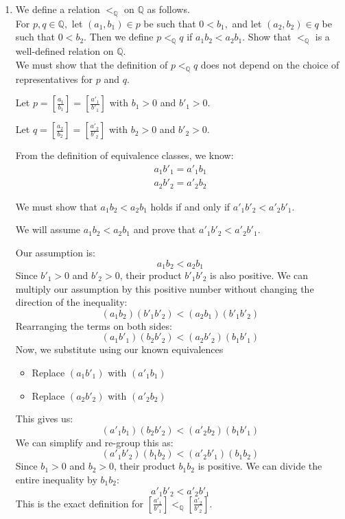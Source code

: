 \documentclass[11pt]{article}
\begin{document}
\begin{enumerate}
\item[c)] We define a relation $<_{\mathbb{Q}}$ on $\mathbb{Q}$ as follows. 
\\For $p,q\in\mathbb{Q},$ let $(a_1,b_1)\in p$ be such that $0<b_1,$ and let $(a_2,b_2)\in q$ be such that $0<b_2.$  Then we define $p<_{\mathbb{Q}} q$ if $a_1b_2<a_2 b_1.$ 
Show that $<_{\mathbb{Q}}$ is a well-defined relation on $\mathbb{Q}.$
\\We must show that the definition of $p <_{\mathbb{Q}} q$ does not depend on the choice of representatives for $p$ and $q$.
    
    Let $p = \left[\frac{a_1}{b_1}\right] = \left[\frac{a'_1}{b'_1}\right]$ with $b_1 > 0$ and $b'_1 > 0$.
    
    Let $q = \left[\frac{a_2}{b_2}\right] = \left[\frac{a'_2}{b'_2}\right]$ with $b_2 > 0$ and $b'_2 > 0$.
    
    From the definition of equivalence classes, we know:
    \begin{align*}
        a_1 b'_1 = a'_1 b_1 \\
        a_2 b'_2 = a'_2 b_2 
    \end{align*}
    
    We must show that $a_1 b_2 < a_2 b_1$ holds if and only if $a'_1 b'_2 < a'_2 b'_1$.
    
    We will assume $a_1 b_2 < a_2 b_1$ and prove that $a'_1 b'_2 < a'_2 b'_1$.
    
    \noindent
    Our assumption is:
    \[
    a_1 b_2 < a_2 b_1
    \]
    Since $b'_1 > 0$ and $b'_2 > 0$, their product $b'_1 b'_2$ is also positive. We can multiply our assumption by this positive number without changing the direction of the inequality:
    \[
    (a_1 b_2) (b'_1 b'_2) < (a_2 b_1) (b'_1 b'_2)
    \]
    Rearranging the terms on both sides:
    \[
    (a_1 b'_1) (b_2 b'_2) < (a_2 b'_2) (b_1 b'_1)
    \]
    Now, we substitute using our known equivalences
    \begin{itemize}
        \item Replace $(a_1 b'_1)$ with $(a'_1 b_1)$
        \item Replace $(a_2 b'_2)$ with $(a'_2 b_2)$
    \end{itemize}
    This gives us:
    \[
    (a'_1 b_1) (b_2 b'_2) < (a'_2 b_2) (b_1 b'_1)
    \]
    We can simplify and re-group this as:
    \[
    (a'_1 b'_2) (b_1 b_2) < (a'_2 b'_1) (b_1 b_2)
    \]
    Since $b_1 > 0$ and $b_2 > 0$, their product $b_1 b_2$ is positive. We can divide the entire inequality by $b_1 b_2$:
    \[
    a'_1 b'_2 < a'_2 b'_1
    \]
    This is the exact definition for $\left[\frac{a'_1}{b'_1}\right] <_{\mathbb{Q}} \left[\frac{a'_2}{b'_2}\right]$.
    

\end{enumerate}
\end{document}

